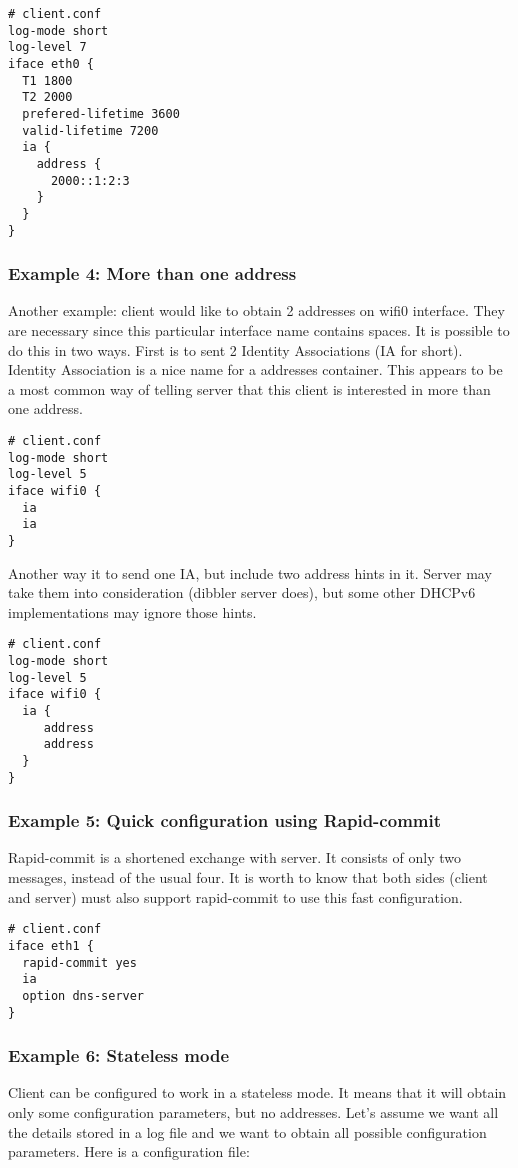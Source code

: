 \begin{lstlisting}
# client.conf
log-mode short
log-level 7
iface eth0 {
  T1 1800
  T2 2000
  prefered-lifetime 3600
  valid-lifetime 7200
  ia {
    address {
      2000::1:2:3
    }
  }
}
\end{lstlisting}

\subsubsection{Example 4: More than one address}

Another example: client would like to obtain 2 addresses on
wifi0 interface. They are necessary since this particular interface name
contains spaces. It is possible to do this in two ways. First is to
sent 2 Identity Associations (IA for short). Identity Association is a
nice name for a addresses container. This appears to be a most common
way of telling server that this client is interested in more than one
address.

\begin{lstlisting}
# client.conf
log-mode short
log-level 5
iface wifi0 {
  ia
  ia
}
\end{lstlisting}

Another way it to send one IA, but include two address hints in
it. Server may take them into consideration (dibbler server does), but
some other DHCPv6 implementations may ignore those hints.

\begin{lstlisting}
# client.conf
log-mode short
log-level 5
iface wifi0 {
  ia {
     address
     address
  }
}
\end{lstlisting}

\subsubsection{Example 5: Quick configuration using Rapid-commit}
Rapid-commit is a shortened exchange with server. It consists of only
two messages, instead of the usual four. It is worth to know that both sides (client
and server) must also support rapid-commit to use this fast
configuration.

\begin{lstlisting}
# client.conf
iface eth1 {
  rapid-commit yes
  ia
  option dns-server
}
\end{lstlisting}

\subsubsection{Example 6: Stateless mode}
Client can be configured to work in a stateless mode. It means that it
will obtain only some configuration parameters, but no
addresses. Let's assume we want all the details stored in a log file and
we want to obtain all possible configuration parameters. Here is a
configuration file:

